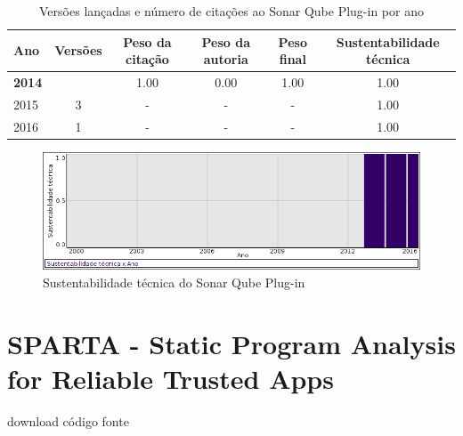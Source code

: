 \begin{table}[H]
\caption{Versões lançadas e número de citações ao Sonar Qube Plug-in por ano}
\centering
\begin{tabular}{| l | c | c | c | c | c |}
  \hline
  Ano & Versões & Peso da citação & Peso da autoria & Peso final & Sustentabilidade técnica \\
  \hline
            {\bf 2014}
          &
          
          &
          1.00
          &
          0.00
          &
          1.00
          &
            {\color{blue} 1.00}
          \\
\hline
        2015 & 3 & - & - & -
        &
          {\color{blue} 1.00}
        \\
\hline
        2016 & 1 & - & - & -
        &
          {\color{blue} 1.00}
        \\
\hline
\end{tabular}
\end{table}

\begin{figure}[h]
  \center
  \includegraphics[scale=0.50]{imagens/softwares-charts/sonarqube-plugin.png}
  \caption{Sustentabilidade técnica do Sonar Qube Plug-in}
\end{figure}


\section{SPARTA - Static Program Analysis for Reliable Trusted Apps}
\checkmark download
\checkmark código fonte


